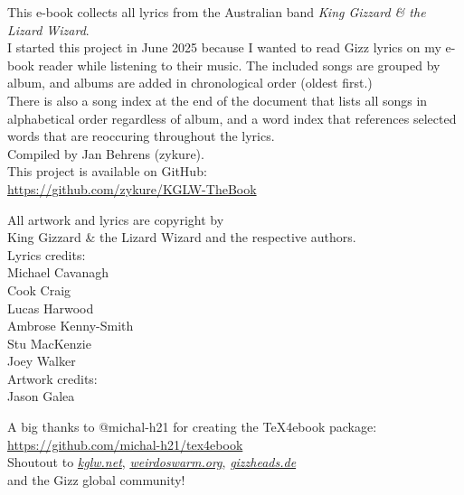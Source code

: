 \begin{center}
{
\vspace*{\fill}

This e-book collects all lyrics from the Australian band \emph{King Gizzard \& the Lizard Wizard}. \\
I started this project in June 2025 because I wanted to read Gizz lyrics on my e-book reader while listening to their music.
The included songs are grouped by album, and albums are added in chronological order (oldest first.) \\
There is also a song index at the end of the document that lists all songs in alphabetical order regardless of album,
and a word index that references selected words that are reoccuring throughout the lyrics. \\[5mm]

Compiled by Jan Behrens (zykure). \\[5mm]

This project is available on GitHub: \\
\href{https://github.com/zykure/KGLW-TheBook}{https://github.com/zykure/KGLW-TheBook} \\[10mm]

\vfill
\epubnewpage
\vspace*{\fill}

All artwork and lyrics are copyright by \\
King Gizzard \& the Lizard Wizard and the respective authors. \\[10mm]

Lyrics credits: \\
Michael Cavanagh \\
Cook Craig \\
Lucas Harwood \\
Ambrose Kenny-Smith \\
Stu MacKenzie \\
Joey Walker \\[10mm]

Artwork credits: \\
Jason Galea \\[10mm]

\vfill
\epubnewpage
\vspace*{\fill}

A big thanks to @michal-h21 for creating the TeX4ebook package: \\
\href{https://github.com/michal-h21/tex4ebook}{https://github.com/michal-h21/tex4ebook}  \\[5mm]

Shoutout to \href{https://kglw.net}{\textit{kglw.net}}, \href{https://weirdoswarm.org}{\textit{weirdoswarm.org}}, \href{https://gizzheads.de}{\textit{gizzheads.de}} \\
and the Gizz global community!  \\

\vfill
}
\end{center}
